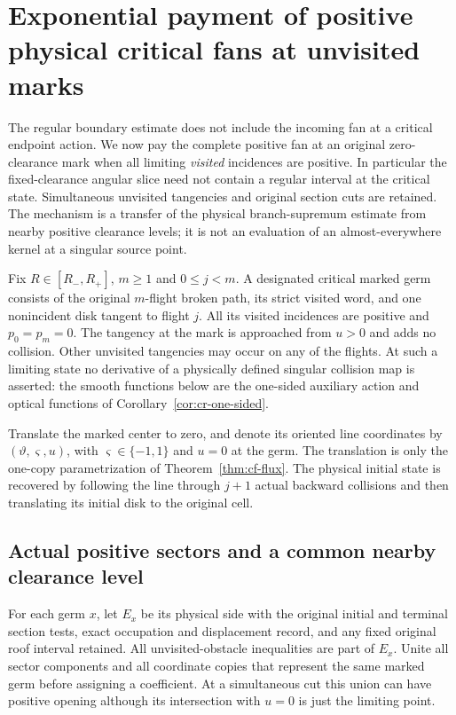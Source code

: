 \section{Exponential payment of positive physical critical fans at unvisited marks}
\label{sec:pf-positive-fans}

The regular boundary estimate does not include the incoming fan at a
critical endpoint action.  We now pay the complete positive fan at an
original zero-clearance mark when all limiting \emph{visited} incidences
are positive.  In particular the fixed-clearance angular slice need
not contain a regular interval at the critical state.  Simultaneous
unvisited tangencies and original section cuts are retained.  The
mechanism is a transfer of the physical branch-supremum estimate from
nearby positive clearance levels; it is not an evaluation of an
almost-everywhere kernel at a singular source point.

Fix $R\in[R_-,R_+]$, $m\ge1$ and $0\le j<m$.  A designated
critical marked germ consists of the original $m$-flight broken path,
its strict visited word, and one nonincident disk tangent to flight
$j$.  All its visited incidences are positive and $p_0=p_m=0$.
The tangency at the mark is approached from $u>0$ and adds no
collision.  Other unvisited tangencies may occur on any of the
flights.  At such a limiting state no derivative of a physically
defined singular collision map is asserted: the smooth functions
below are the one-sided auxiliary action and optical functions of
Corollary~\ref{cor:cr-one-sided}.

Translate the marked center to zero, and denote its oriented line
coordinates by $(\vartheta,\varsigma,u)$, with
$\varsigma\in\{-1,1\}$ and $u=0$ at the germ.  The translation is
only the one-copy parametrization of Theorem~\ref{thm:cf-flux}.
The physical initial state is recovered by following the line through
$j+1$ actual backward collisions and then translating its initial
disk to the original cell.

\subsection{Actual positive sectors and a common nearby clearance level}

For each germ $x$, let $E_x$ be its physical side with the original
initial and terminal section tests, exact occupation and displacement
record, and any fixed original roof interval retained.  All
unvisited-obstacle inequalities are part of $E_x$.  Unite all sector
components and all coordinate copies that represent the same marked
germ before assigning a coefficient.  At a simultaneous cut this
union can have positive opening although its intersection with
$u=0$ is just the limiting point.

